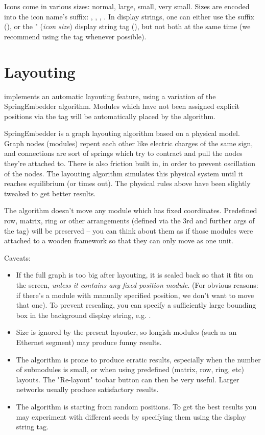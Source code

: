 Icons come in various sizes: normal, large, small, very small. Sizes are
encoded into the icon name's suffix: , , , .
In display strings, one can either use the suffix (),
or the " (\textit{icon size}) display string tag (),
but not both at the same time (we recommend using the  tag whenever possible).


\section{Layouting}
\label{sec:ch-graphics:layouting}

{\opp} implements an automatic layouting feature, using
a variation of the SpringEmbedder algorithm. Modules which have
not been assigned explicit positions via the  tag will be
automatically placed by the algorithm.

SpringEmbedder is a graph layouting algorithm based on a physical model.
Graph nodes (modules) repent each other like electric charges
of the same sign, and connections are sort of springs which try
to contract and pull the nodes they're attached to. There is also friction
built in, in order to prevent oscillation of the nodes. The layouting algorithm
simulates this physical system until it reaches equilibrium
(or times out). The physical rules above have been slightly tweaked
to get better results.

The algorithm doesn't move any module which has fixed coordinates.
Predefined row, matrix, ring or other arrangements (defined
via the 3rd and further args of the  tag) will be preserved --
you can think about them as if those modules were attached
to a wooden framework so that they can only move as one unit.

Caveats:

\begin{itemize}
  \item If the full graph is too big after layouting, it is scaled
    back so that it fits on the screen, \textit{unless it contains
    any fixed-position module}. (For obvious reasons: if there's a module
    with manually specified position, we don't want to move that one).
    To prevent rescaling, you can specify a sufficiently large bounding
    box in the background display string, e.g. .
  \item Size is ignored by the present layouter, so longish modules
    (such as an Ethernet segment) may produce funny results.
  \item The algorithm is prone to produce erratic results, especially
    when the number of submodules is small, or when using predefined
    (matrix, row, ring, etc) layouts. The "Re-layout" toobar button
    can then be very useful. Larger networks usually produce
    satisfactory results.
  \item The algorithm is starting from random positions.
     To get the best results you may experiment with
    different seeds by specifying them using the 
    display string tag.
\end{itemize}

